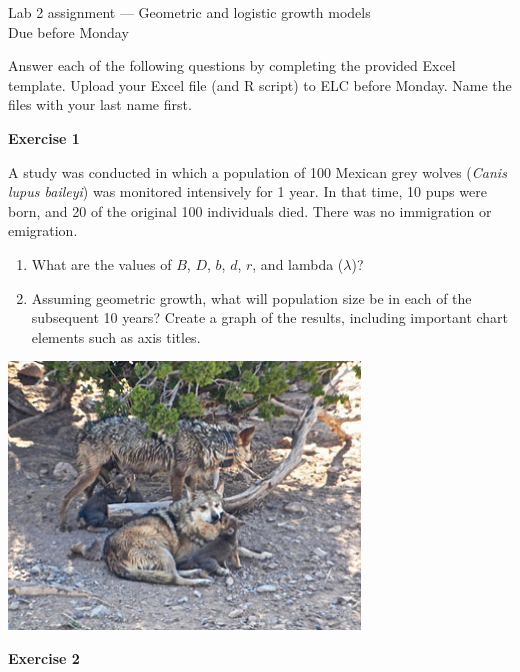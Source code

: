\documentclass[12pt]{article}\usepackage[]{graphicx}\usepackage[]{color}
\begin{document}
{
  \Large
  \centering
  Lab 2 assignment --- Geometric and logistic growth models \\
  Due before Monday \par
}

Answer each of the following questions by completing the provided Excel 
template.  Upload your Excel file (and R script) to
ELC before Monday. Name the files with your last name first. \\

\vspace{12pt}

{\bf Exercise 1 \\}

A study was conducted in which a population of 100 Mexican grey wolves
({\it Canis lupus baileyi}) was monitored intensively for 1 year. In
that time, 10 pups were born, and 20 of the original 100 individuals 
died. There was no immigration or emigration.  

\begin{enumerate}
  \item What are the values of $B$, $D$, $b$, $d$, $r$, and lambda
    ($\lambda$)?
  \item Assuming geometric growth, what will population size be in
    each of the subsequent 10 years? Create a graph of the results,
    including important chart elements such as axis titles.
\end{enumerate}

\vspace{24pt}

{
  \centering
  \includegraphics[width=0.7\textwidth]{figs/Coronadopack2} \\
}


\clearpage

{\bf Exercise 2 \\}
\end{document}
